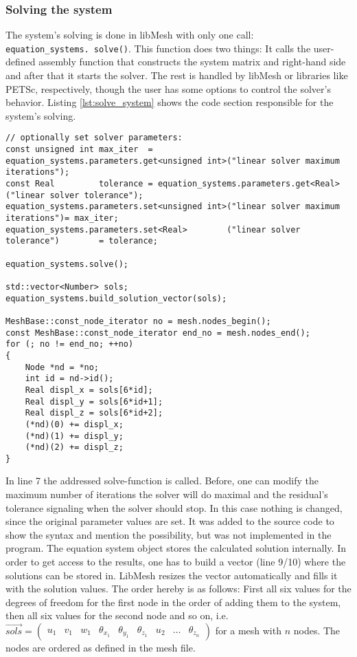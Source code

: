   \subsubsection{Solving the system}\label{sec:Impl-Details-Solving}
  The system's solving is done in libMesh with only one call: \texttt{equation\_systems.\ solve()}. This function does two things: It calls the user-defined assembly function that constructs the system matrix and right-hand side and after that it starts the solver. The rest is handled by libMesh or libraries like PETSc, respectively, though the user has some options to control the solver's behavior. Listing \ref{lst:solve_system} shows the code section responsible for the system's solving.
\begin{lstlisting}[caption=Solve the system and build solution,label=lst:solve_system,keepspaces=true]
// optionally set solver parameters:
const unsigned int max_iter  = equation_systems.parameters.get<unsigned int>("linear solver maximum iterations");
const Real         tolerance = equation_systems.parameters.get<Real>("linear solver tolerance");
equation_systems.parameters.set<unsigned int>("linear solver maximum iterations")= max_iter;
equation_systems.parameters.set<Real>        ("linear solver tolerance")        = tolerance;

equation_systems.solve();

std::vector<Number> sols;
equation_systems.build_solution_vector(sols);

MeshBase::const_node_iterator no = mesh.nodes_begin();
const MeshBase::const_node_iterator end_no = mesh.nodes_end();
for (; no != end_no; ++no)
{
	Node *nd = *no;
	int id = nd->id();
	Real displ_x = sols[6*id];
	Real displ_y = sols[6*id+1];
	Real displ_z = sols[6*id+2];
	(*nd)(0) += displ_x;
	(*nd)(1) += displ_y;
	(*nd)(2) += displ_z;
}
\end{lstlisting}
   In line 7 the addressed solve-function is called. Before, one can modify the maximum number of iterations the solver will do maximal and the residual's tolerance signaling when the solver should stop. In this case nothing is changed, since the original parameter values are set. It was added to the source code to show the syntax and mention the possibility, but was not implemented in the program.
   The equation system object stores the calculated solution internally. In order to get access to the results, one has to build a vector (line 9/10) where the solutions can be stored in. LibMesh resizes the vector automatically and fills it with the solution values. The order hereby is as follows: First all six values for the degrees of freedom for the first node in the order of adding them to the system, then all six values for the second node and so on, i.e. $\overrightarrow{sols} = \begin{pmatrix}
   u_1 & v_1 & w_1 & \theta_{x_1} & \theta_{y_1} & \theta_{z_1} & u_2 & \ldots & \theta_{z_n}
   \end{pmatrix}$ for a mesh with $n$ nodes. The nodes are ordered as defined in the mesh file.
